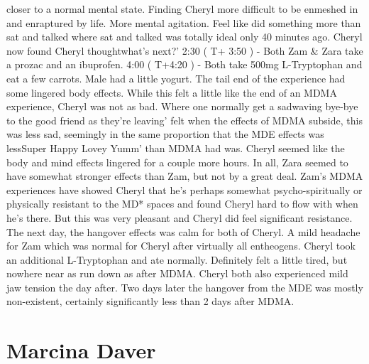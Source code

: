 \documentclass[12pt]{book}
\begin{document}
closer to a normal mental state. Finding Cheryl more difficult to be enmeshed in and enraptured by life. More mental agitation. Feel like did something more than sat and talked where sat and talked was totally ideal only 40 minutes ago. Cheryl now found Cheryl thoughtwhat's next?' 2:30 ( T+ 3:50 ) - Both Zam \& Zara take a prozac and an ibuprofen. 4:00 ( T+4:20 ) - Both take 500mg L-Tryptophan and eat a few carrots. Male had a little yogurt. The tail end of the experience had some lingered body effects. While this felt a little like the end of an MDMA experience, Cheryl was not as bad. Where one normally get a sadwaving bye-bye to the good friend as they're leaving' felt when the effects of MDMA subside, this was less sad, seemingly in the same proportion that the MDE effects was lessSuper Happy Lovey Yumm' than MDMA had was. Cheryl seemed like the body and mind effects lingered for a couple more hours. In all, Zara seemed to have somewhat stronger effects than Zam, but not by a great deal. Zam's MDMA experiences have showed Cheryl that he's perhaps somewhat psycho-spiritually or physically resistant to the MD* spaces and found Cheryl hard to flow with when he's there. But this was very pleasant and Cheryl did feel significant resistance. The next day, the hangover effects was calm for both of Cheryl. A mild headache for Zam which was normal for Cheryl after virtually all entheogens. Cheryl took an additional L-Tryptophan and ate normally. Definitely felt a little tired, but nowhere near as run down as after MDMA. Cheryl both also experienced mild jaw tension the day after. Two days later the hangover from the MDE was mostly non-existent, certainly significantly less than 2 days after MDMA.



\chapter{Marcina Daver}
\end{document}
